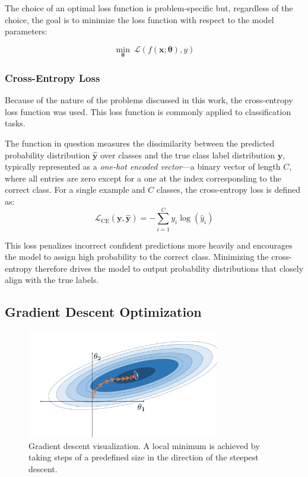 \documentclass{pracalicmgr}
\begin{document}
The choice of an optimal loss function is problem-specific but, regardless of the choice, the goal is to minimize the loss function with respect to the model parameters:

\[
\min_{\boldsymbol{\theta}} \ \mathcal{L}(f(\mathbf{x}; \boldsymbol{\theta}), y)
\]

\subsubsection{Cross-Entropy Loss}

Because of the nature of the problems discussed in this work, the cross-entropy loss function was used. This loss function is commonly applied to classification tasks.

The function in question measures the dissimilarity between the predicted probability distribution \( \hat{\mathbf{y}} \) over classes and the true class label distribution \( \mathbf{y} \), typically represented as a \textit{one-hot encoded vector}—a binary vector of length \( C \), where all entries are zero except for a one at the index corresponding to the correct class. For a single example and \( C \) classes, the cross-entropy loss is defined as:
\[
\mathcal{L}_{\text{CE}}(\mathbf{y}, \hat{\mathbf{y}}) = -\sum_{i=1}^{C} y_i \log(\hat{y}_i)
\]

This loss penalizes incorrect confident predictions more heavily and encourages the model to assign high probability to the correct class. Minimizing the cross-entropy therefore drives the model to output probability distributions that closely align with the true labels.

\subsection{Gradient Descent Optimization}

\begin{figure}[H]
    \centering
    \includegraphics[width=0.75\textwidth]{src/gradienDescent.png}
    \caption{Gradient descent visualization. A local minimum is achieved by taking steps of a predefined size in the direction of the steepest descent\cite{Lau2023LearningDS}.}
\end{figure}
\end{document}
